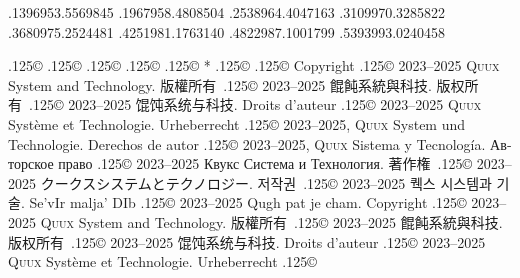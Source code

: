 \documentclass{cookbook}
\begin{document}
{{{	.1396953\textwidth .5569845\textwidth%
	.1967958\textwidth .4808504\textwidth
	.2538964\textwidth .4047163\textwidth
	.3109970\textwidth .3285822\textwidth
	.3680975\textwidth .2524481\textwidth
	.4251981\textwidth .1763140\textwidth%
	.4822987\textwidth .1001799\textwidth%
	.5393993\textwidth .0240458\textwidth%
\rule{0pt}{0pt}%
{\lower.125\baselineskip\hbox{\copyright}}
{\lower.125\baselineskip\hbox{\copyright}}
{\lower.125\baselineskip\hbox{\copyright}}
{\lower.125\baselineskip\hbox{\copyright}}
{\lower.125\baselineskip\hbox{\copyright}}
\hspace{.25em plus 1em}%
*\texttt{{\gitabbrcommithash}}
{\lower.125\baselineskip\hbox{\copyright}}
{\lower.125\baselineskip\hbox{\copyright}}
Copyright {\lower.125\baselineskip\hbox{\copyright}}
	2023--2025 \textsc{Quux} System and Technology.
版權所有~{\lower.125\baselineskip\hbox{\copyright}}
	2023--2025 餛飩系統與科技.
版权所有~{\lower.125\baselineskip\hbox{\copyright}}
	2023--2025 馄饨系统与科技.
Droits d'auteur {\lower.125\baselineskip\hbox{\copyright}} %
	2023--2025 \textsc{Quux} Système et Technologie.
Urheberrecht {\lower.125\baselineskip\hbox{\copyright}} %
	2023--2025, \textsc{Quux} System und Technologie.
Derechos de autor {\lower.125\baselineskip\hbox{\copyright}} %
	2023--2025, \textsc{Quux} Sistema y Tecnología.
\foreignlanguage{russian}{Авторское право} %
	{\lower.125\baselineskip\hbox{\copyright}}
	2023–2025 \foreignlanguage{russian}{Квукс Система и Технология.}
著作権~{\lower.125\baselineskip\hbox{\copyright}}
	2023--2025 クークスシステムとテクノロジー.
저작권~{\lower.125\baselineskip\hbox{\copyright}}
	2023--2025 퀙스 시스템과 기술.
Se'vIr malja' DIb {\lower.125\baselineskip\hbox{\copyright}} %
	2023--2025 Qugh pat je cham.
\dag\texttt{{\gitabbrcommithash}}
Copyright {\lower.125\baselineskip\hbox{\copyright}}
	2023--2025 \textsc{Quux} System and Technology.
版權所有~{\lower.125\baselineskip\hbox{\copyright}}
	2023--2025 餛飩系統與科技.
版权所有~{\lower.125\baselineskip\hbox{\copyright}}
	2023--2025 馄饨系统与科技.
Droits d'auteur {\lower.125\baselineskip\hbox{\copyright}} %
	2023--2025 \textsc{Quux} Système et Technologie.
Urheberrecht {\lower.125\baselineskip\hbox{\copyright}} %
}}}
\end{document}
